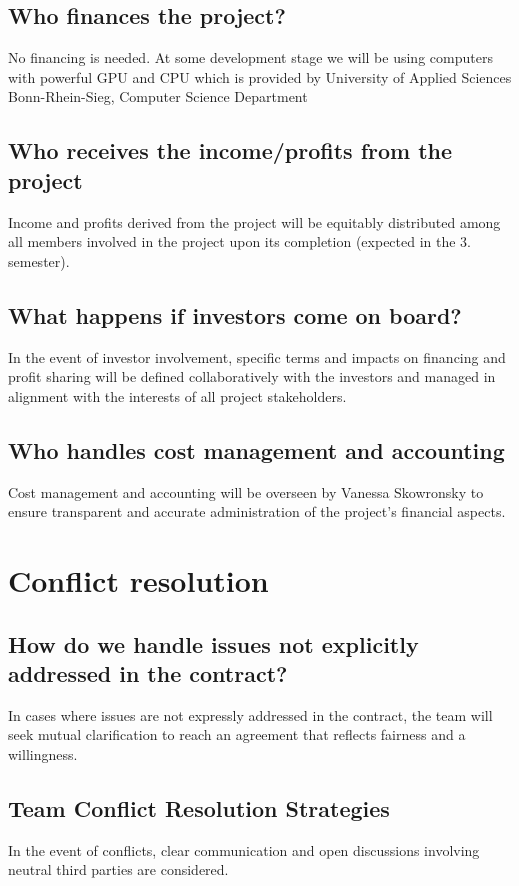 \documentclass{article}
\begin{document}
\subsection{Who finances the project?}
No financing is needed. At some development stage we will be using computers with powerful GPU and CPU which is provided by University of Applied Sciences Bonn-Rhein-Sieg, Computer Science Department
\subsection{Who receives the income/profits from the project}
Income and profits derived from the project will be equitably distributed among all members involved in the project upon its completion (expected in the 3. semester).
\subsection{What happens if investors come on board?}
In the event of investor involvement, specific terms and impacts on financing and profit sharing will be defined collaboratively with the investors and managed in alignment with the interests of all project stakeholders.
\subsection{Who handles cost management and accounting}
Cost management and accounting will be overseen by Vanessa Skowronsky to ensure transparent and accurate administration of the project's financial aspects.

\section{Conflict resolution}
\subsection{How do we handle issues not explicitly addressed in the contract?}
In cases where issues are not expressly addressed in the contract, the team will seek mutual clarification to reach an agreement that reflects fairness and a willingness.

\subsection{Team Conflict Resolution Strategies}
In the event of conflicts, clear communication and open discussions involving neutral third parties are considered.
\end{document}
